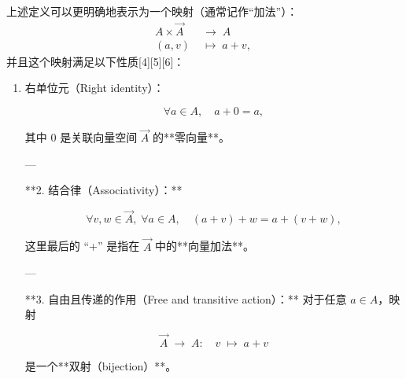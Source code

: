 上述定义可以更明确地表示为一个映射（通常记作“加法”）：
$$
\begin{aligned}
A \times \overrightarrow{A} &\;\longrightarrow\; A \\
(a, v) &\;\longmapsto\; a + v,
\end{aligned}~
$$
并且这个映射满足以下性质[4][5][6]：
\begin{enumerate}
\item 右单位元（Right identity）：

$$
\forall a \in A, \quad a + 0 = a,
$$

其中 $0$ 是关联向量空间 $\overrightarrow{A}$ 的**零向量**。

---

**2. 结合律（Associativity）：**

$$
\forall v, w \in \overrightarrow{A},\; \forall a \in A, \quad (a + v) + w = a + (v + w),
$$

这里最后的 “+” 是指在 $\overrightarrow{A}$ 中的**向量加法**。

---

**3. 自由且传递的作用（Free and transitive action）：**
对于任意 $a \in A$，映射

$$
\overrightarrow{A} \;\longrightarrow\; A: \quad v \;\longmapsto\; a + v
$$

是一个**双射（bijection）**。

\end{enumerate}